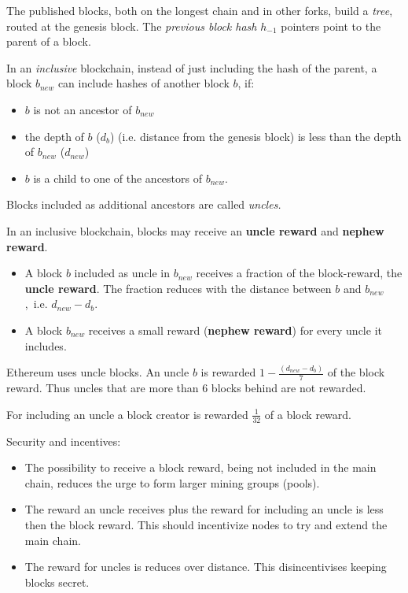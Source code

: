 \begin{definition} The published blocks, both on the longest chain and in other forks, build a \emph{tree}, routed at the genesis block.
The \emph{previous block hash} $h_{-1}$ pointers point to the parent of a block.
\end{definition}
\begin{definition}
	In an \emph{inclusive} blockchain, instead of just including the hash of the parent, a block $b_{new}$ can include hashes of another block $b$, if:
	\begin{itemize}
		\item $b$ is not an ancestor of $b_{new}$
		\item the depth of $b$ ($d_b$) (i.e. distance from the genesis block) is less than the depth of $b_{new}$ ($d_{new}$)
		\item $b$ is a child to one of the ancestors of $b_{new}$.
	\end{itemize}
	Blocks included as additional ancestors are called \emph{uncles.}
\end{definition}

\begin{definition}
In an inclusive blockchain, blocks may receive an \textbf{uncle reward} and \textbf{nephew reward}.
	\begin{itemize}
		\item A block $b$ included as uncle in $b_{new}$ receives a fraction of the block-reward, the \textbf{uncle reward}. The fraction reduces with the distance between $b$ and $b_{new}$,~i.e. $d_{new}-d_{b}$.
		\item A block $b_{new}$ receives a small reward (\textbf{nephew reward}) for every uncle it includes.
	\end{itemize}
\end{definition}

\begin{example}
Ethereum uses uncle blocks. An uncle $b$ is rewarded $1-\frac{(d_{new}-d_b)}{7}$ of the block reward. Thus uncles that are more than 6 blocks behind are not rewarded.

For including an uncle a block creator is rewarded $\frac{1}{32}$ of a block reward.
\end{example}

\begin{note}
Security and incentives:
\begin{itemize}
	\item The possibility to receive a block reward, being not included in the main chain, reduces the urge to form larger mining groups (pools).
	\item The reward an uncle receives plus the reward for including an uncle is less then the block reward. This should incentivize nodes to try and extend the main chain.
	\item The reward for uncles is reduces over distance. This disincentivises keeping blocks secret. 
\end{itemize}
\end{note}


